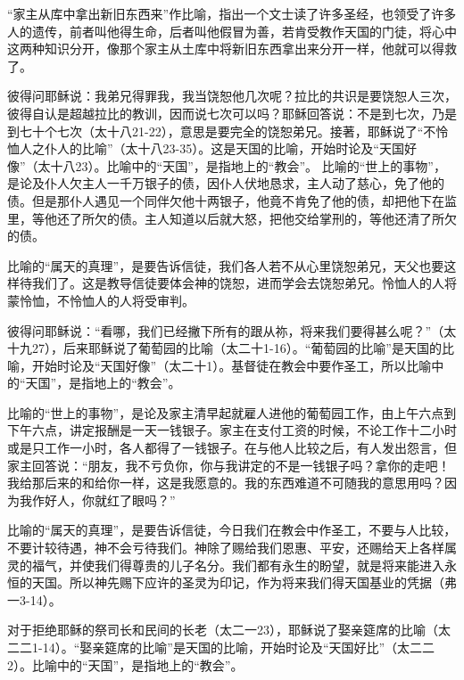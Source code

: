 “家主从库中拿出新旧东西来”作比喻，指出一个文士读了许多圣经，也领受了许多人的遗传，前者叫他得生命，后者叫他假冒为善，若肯受教作天国的门徒，将心中这两种知识分开，像那个家主从土库中将新旧东西拿出来分开一样，他就可以得救了。



彼得问耶稣说：我弟兄得罪我，我当饶恕他几次呢？拉比的共识是要饶恕人三次，彼得自认是超越拉比的教训，因而说七次可以吗？耶稣回答说：不是到七次，乃是到七十个七次（太十八21-22），意思是要完全的饶恕弟兄。接著，耶稣说了“不怜恤人之仆人的比喻”（太十八23-35）。这是天国的比喻，开始时论及“天国好像”（太十八23）。比喻中的“天国”，是指地上的“教会”。
比喻的“世上的事物”，是论及仆人欠主人一千万银子的债，因仆人伏地恳求，主人动了慈心，免了他的债。但是那仆人遇见一个同伴欠他十两银子，他竟不肯免了他的债，却把他下在监里，等他还了所欠的债。主人知道以后就大怒，把他交给掌刑的，等他还清了所欠的债。

比喻的“属天的真理”，是要告诉信徒，我们各人若不从心里饶恕弟兄，天父也要这样待我们了。这是教导信徒要体会神的饶恕，进而学会去饶恕弟兄。怜恤人的人将蒙怜恤，不怜恤人的人将受审判。


彼得问耶稣说：“看哪，我们已经撇下所有的跟从祢，将来我们要得甚么呢？”（太十九27），后来耶稣说了葡萄园的比喻（太二十1-16）。“葡萄园的比喻”是天国的比喻，开始时论及“天国好像”（太二十1）。基督徒在教会中要作圣工，所以比喻中的“天国”，是指地上的“教会”。

比喻的“世上的事物”，是论及家主清早起就雇人进他的葡萄园工作，由上午六点到下午六点，讲定报酬是一天一钱银子。家主在支付工资的时候，不论工作十二小时或是只工作一小时，各人都得了一钱银子。在与他人比较之后，有人发出怨言，但家主回答说：“朋友，我不亏负你，你与我讲定的不是一钱银子吗？拿你的走吧！我给那后来的和给你一样，这是我愿意的。我的东西难道不可随我的意思用吗？因为我作好人，你就红了眼吗？”

比喻的“属天的真理”，是要告诉信徒，今日我们在教会中作圣工，不要与人比较，不要计较待遇，神不会亏待我们。神除了赐给我们恩惠、平安，还赐给天上各样属灵的福气，并使我们得尊贵的儿子名分。我们都有永生的盼望，就是将来能进入永恒的天国。所以神先赐下应许的圣灵为印记，作为将来我们得天国基业的凭据（弗一3-14）。


对于拒绝耶稣的祭司长和民间的长老（太二一23），耶稣说了娶亲筵席的比喻（太二二1-14）。“娶亲筵席的比喻”是天国的比喻，开始时论及“天国好比”（太二二2）。比喻中的“天国”，是指地上的“教会”。


